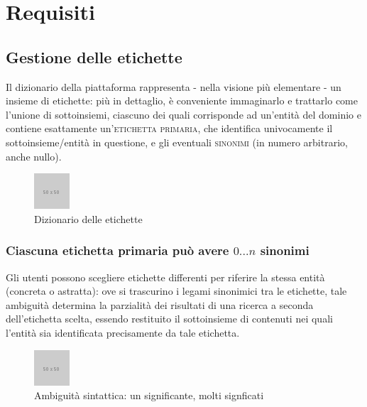 \documentclass[10pt,a4paper,headinclude,footinclude,hidelinks]{scrreprt} %
\begin{document}
	
	\chapter{Requisiti}
	\label{ch:stage:req}
	
	\section{Gestione delle etichette}
	\label{sec:stage:req:tag}
	
	Il dizionario della piattaforma rappresenta - nella visione più elementare - un insieme di etichette: più in dettaglio, è conveniente immaginarlo e trattarlo come l'unione di sottoinsiemi, ciascuno dei quali corrisponde ad un'entità del dominio e contiene esattamente un'\textsc{etichetta primaria}, che identifica univocamente il sottoinsieme/entità in questione, e gli eventuali \textsc{sinonimi} (in numero arbitrario, anche nullo).

	\begin{figure}[ht]
		\begin{center}
	    	\includegraphics{../placeholder.png}
			\caption{Dizionario delle etichette}
		\end{center}
	\end{figure}

	\subsection[Sinonimi]{Ciascuna etichetta primaria può avere $0...n$ sinonimi}
	Gli utenti possono scegliere etichette differenti per riferire la stessa entità (concreta o astratta): ove si trascurino i legami sinonimici tra le etichette, tale ambiguità determina la parzialità dei risultati di una ricerca a seconda dell'etichetta scelta, essendo restituito il sottoinsieme di contenuti nei quali l'entità sia identificata precisamente da tale etichetta.
	
	\begin{figure}[ht]
		\begin{center}
	    	\includegraphics{../placeholder.png}
			\caption[Ambiguità sintattica]{Ambiguità sintattica: un significante, molti signficati}
		\end{center}
	\end{figure}
\end{document}
